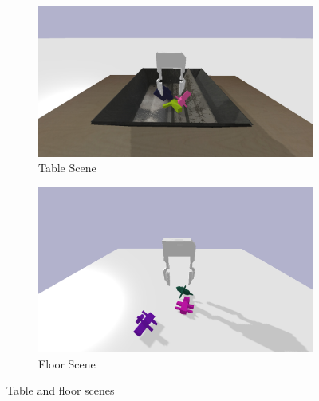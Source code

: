 \begin{figure}

    \begin{subfigure}{0.49\textwidth}
      \includegraphics[width=\linewidth]{figures/tray.png}
      \caption{Table Scene} \label{fig:table}
    \end{subfigure}%
    \hspace*{\fill}   %
    \begin{subfigure}{0.49\textwidth}
      \includegraphics[width=\linewidth]{figures/floor.png}
      \caption{Floor Scene} \label{fig:floor}
    \end{subfigure}%
    \hspace*{\fill}   %


\caption{ Table and floor scenes \label{fig:scenes}}
\end{figure}